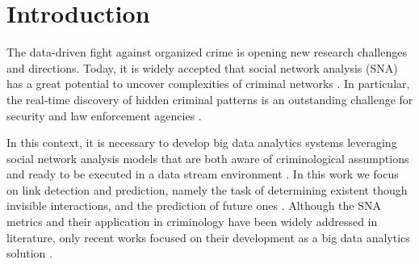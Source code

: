 \section{Introduction}
\label{sec:introduction}

The data-driven fight against organized crime is opening new research challenges and directions. 
Today, it is widely accepted that social network analysis (SNA) has a great potential to uncover complexities of criminal networks \cite{berlusconi2017social}.
In particular, the real-time discovery of hidden criminal patterns is an outstanding challenge for security and law enforcement agencies \cite{berlusconi2016link}.

In this context, it is necessary to develop big data analytics systems leveraging social network analysis models that are both aware of criminological assumptions and ready to be executed in a data stream environment \cite{xu2005criminal,xu2004analyzing}.
In this work we focus on link detection and prediction, namely the task of determining existent though invisible interactions, and the prediction of future ones \cite{Hasan2011}.
Although the SNA metrics and their application in criminology have been widely addressed in literature, only recent works focused on their development as a big data analytics solution \cite{pramanik2016framework}.

 


